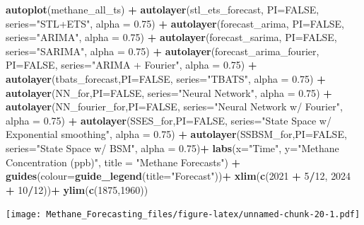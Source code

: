 \documentclass[
]{article}
\newenvironment{Shaded}{\begin{snugshade}}{\end{snugshade}}
\newcommand{\AttributeTok}[1]{\textcolor[rgb]{0.13,0.29,0.53}{#1}}
\newcommand{\ConstantTok}[1]{\textcolor[rgb]{0.56,0.35,0.01}{#1}}
\newcommand{\DecValTok}[1]{\textcolor[rgb]{0.00,0.00,0.81}{#1}}
\newcommand{\FloatTok}[1]{\textcolor[rgb]{0.00,0.00,0.81}{#1}}
\newcommand{\FunctionTok}[1]{\textcolor[rgb]{0.13,0.29,0.53}{\textbf{#1}}}
\newcommand{\NormalTok}[1]{#1}
\newcommand{\SpecialCharTok}[1]{\textcolor[rgb]{0.81,0.36,0.00}{\textbf{#1}}}
\newcommand{\StringTok}[1]{\textcolor[rgb]{0.31,0.60,0.02}{#1}}
\begin{document}
\begin{Shaded}
\begin{Highlighting}[]
\FunctionTok{autoplot}\NormalTok{(methane\_all\_ts) }\SpecialCharTok{+}
  \FunctionTok{autolayer}\NormalTok{(stl\_ets\_forecast, }\AttributeTok{PI=}\ConstantTok{FALSE}\NormalTok{, }\AttributeTok{series=}\StringTok{"STL+ETS"}\NormalTok{, }\AttributeTok{alpha =} \FloatTok{0.75}\NormalTok{) }\SpecialCharTok{+}
  \FunctionTok{autolayer}\NormalTok{(forecast\_arima, }\AttributeTok{PI=}\ConstantTok{FALSE}\NormalTok{, }\AttributeTok{series=}\StringTok{"ARIMA"}\NormalTok{, }\AttributeTok{alpha =} \FloatTok{0.75}\NormalTok{) }\SpecialCharTok{+}
  \FunctionTok{autolayer}\NormalTok{(forecast\_sarima, }\AttributeTok{PI=}\ConstantTok{FALSE}\NormalTok{, }\AttributeTok{series=}\StringTok{"SARIMA"}\NormalTok{, }\AttributeTok{alpha =} \FloatTok{0.75}\NormalTok{) }\SpecialCharTok{+}
  \FunctionTok{autolayer}\NormalTok{(forecast\_arima\_fourier, }\AttributeTok{PI=}\ConstantTok{FALSE}\NormalTok{, }\AttributeTok{series=}\StringTok{"ARIMA + Fourier"}\NormalTok{, }\AttributeTok{alpha =} \FloatTok{0.75}\NormalTok{) }\SpecialCharTok{+}
  \FunctionTok{autolayer}\NormalTok{(tbats\_forecast,}\AttributeTok{PI=}\ConstantTok{FALSE}\NormalTok{, }\AttributeTok{series=}\StringTok{"TBATS"}\NormalTok{, }\AttributeTok{alpha =} \FloatTok{0.75}\NormalTok{) }\SpecialCharTok{+}
  \FunctionTok{autolayer}\NormalTok{(NN\_for,}\AttributeTok{PI=}\ConstantTok{FALSE}\NormalTok{, }\AttributeTok{series=}\StringTok{"Neural Network"}\NormalTok{, }\AttributeTok{alpha =} \FloatTok{0.75}\NormalTok{) }\SpecialCharTok{+}
  \FunctionTok{autolayer}\NormalTok{(NN\_fourier\_for,}\AttributeTok{PI=}\ConstantTok{FALSE}\NormalTok{, }\AttributeTok{series=}\StringTok{"Neural Network w/ Fourier"}\NormalTok{, }\AttributeTok{alpha =} \FloatTok{0.75}\NormalTok{) }\SpecialCharTok{+}
  \FunctionTok{autolayer}\NormalTok{(SSES\_for,}\AttributeTok{PI=}\ConstantTok{FALSE}\NormalTok{, }\AttributeTok{series=}\StringTok{"State Space w/ Exponential smoothing"}\NormalTok{, }\AttributeTok{alpha =} \FloatTok{0.75}\NormalTok{) }\SpecialCharTok{+}
  \FunctionTok{autolayer}\NormalTok{(SSBSM\_for,}\AttributeTok{PI=}\ConstantTok{FALSE}\NormalTok{, }\AttributeTok{series=}\StringTok{"State Space w/ BSM"}\NormalTok{, }\AttributeTok{alpha =} \FloatTok{0.75}\NormalTok{)}\SpecialCharTok{+}
  \FunctionTok{labs}\NormalTok{(}\AttributeTok{x=}\StringTok{"Time"}\NormalTok{,}
       \AttributeTok{y=}\StringTok{"Methane Concentration (ppb)"}\NormalTok{,}
       \AttributeTok{title =} \StringTok{"Methane Forecasts"}\NormalTok{) }\SpecialCharTok{+}
  \FunctionTok{guides}\NormalTok{(}\AttributeTok{colour=}\FunctionTok{guide\_legend}\NormalTok{(}\AttributeTok{title=}\StringTok{"Forecast"}\NormalTok{))}\SpecialCharTok{+}
  \FunctionTok{xlim}\NormalTok{(}\FunctionTok{c}\NormalTok{(}\DecValTok{2021} \SpecialCharTok{+} \DecValTok{5}\SpecialCharTok{/}\DecValTok{12}\NormalTok{, }\DecValTok{2024} \SpecialCharTok{+} \DecValTok{10}\SpecialCharTok{/}\DecValTok{12}\NormalTok{))}\SpecialCharTok{+}
  \FunctionTok{ylim}\NormalTok{(}\FunctionTok{c}\NormalTok{(}\DecValTok{1875}\NormalTok{,}\DecValTok{1960}\NormalTok{))}
\end{Highlighting}
\end{Shaded}

\texttt{[image: Methane\_Forecasting\_files/figure-latex/unnamed-chunk-20-1.pdf]}
\end{document}

